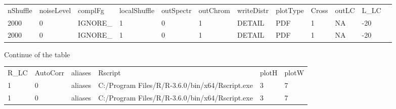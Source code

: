 \documentclass{article}
\newcommand{\tw}{\textwidth}
\begin{document}
\begin{flushright}
\begin{minipage}{0.9\tw}
\begin{shaded} 
\begin{scriptsize}
\begin{tabular}{llllllllllll}
 nShuffle & noiseLevel & complFg & localShuffle & outSpectr & outChrom & writeDistr & plotType & Cross & outLC & L\_LC \\
 2000     & 0          & IGNORE\_ & 1           & 0         & 1        & DETAIL     & PDF     & 1     & NA    & -20   \\
 2000     & 0          & IGNORE\_ & 1           & 0         & 1        & DETAIL     & PDF     & 1     & NA    & -20   \\
\end{tabular}
\end{scriptsize}
\end{shaded}
\end{minipage} 
\end{flushright}

Continue of the table

\begin{flushright}
\begin{minipage}{0.7\tw}
\begin{shaded} 
\begin{scriptsize}
\begin{tabular}{llllll}
 R\_LC &AutoCorr & aliases & Rscript                                        & plotH &plotW\\
 1     &0        & aliases & C:/Program Files/R/R-3.6.0/bin/x64/Rscript.exe & 3     & 7   \\ 
 1     &0        & aliases & C:/Program Files/R/R-3.6.0/bin/x64/Rscript.exe & 3     & 7   \\
\end{tabular}
\end{scriptsize}
\end{shaded}
\end{minipage} 

\end{flushright}
\end{document}
